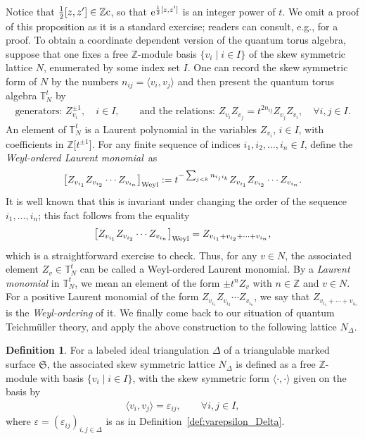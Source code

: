 \documentclass[pdftex]{sigma}
\numberwithin{equation}{section}
\theoremstyle{definition}
\newtheorem{Definition}[Theorem]{Definition}
\begin{document}
Notice that $\frac{1}{2} [z,z'] \in \mathbb{Z}{\rm c}$, so that ${\rm e}^{\frac{1}{2} [z,z']}$ is an integer power of $t$. We omit a proof of this proposition as it is a standard exercise; readers can consult, e.g., \cite{Kim_mutation} for a proof.
To obtain a coordinate dependent version of the quantum torus algebra, suppose that one fixes a free $\mathbb{Z}$-module basis $\{v_i \mid i \in I\}$ of the skew symmetric lattice $N$, enumerated by some index set $I$. One can record the skew symmetric form of $N$ by the numbers $n_{ij} = \langle v_i, v_j \rangle$ and then present the quantum torus algebra $\mathbb{T}^t_N$ by
\begin{align*}
\mbox{generators: } Z_{v_i}^{\pm 1}, \quad i\in I, \qquad \mbox{and the relations: } Z_{v_i} Z_{v_j} = t^{2 n_{ij}} Z_{v_j} Z_{v_i}, \quad \forall i,j\in I.
\end{align*}
An element of $\mathbb{T}^t_N$ is a Laurent polynomial in the variables $Z_{v_i}$, $i\in I$, with coefficients in $\mathbb{Z}\bigl[t^{\pm 1}\bigr]$. For any finite sequence of indices $i_1,i_2,\dots,i_n \in I$, define the {\em Weyl-ordered Laurent monomial}~as
\begin{align}
\label{eq:Weyl-ordering}
\bigl[Z_{v_{i_1}} Z_{v_{i_2}} \cdots Z_{v_{i_n}} \bigr]_{\rm Weyl} := t^{-\sum_{j<k} n_{i_j i_k}} Z_{v_{i_1}} Z_{v_{i_2}} \cdots Z_{v_{i_n}}.
\end{align}
It is well known that this is invariant under changing the order of the sequence $i_1,\dots,i_n$; this fact follows from the equality
\[
\bigl[Z_{v_{i_1}} Z_{v_{i_2}} \cdots Z_{v_{i_n}} \bigr]_{\rm Weyl} = Z_{v_{i_1} + v_{i_2} + \cdots + v_{i_n}},
\]
which is a straightforward exercise to check. Thus, for any $v\in N$, the associated element $Z_v \in \mathbb{T}^t_N$ can be called a Weyl-ordered Laurent monomial. By a {\em Laurent monomial} in $\mathbb{T}^t_N$, we mean an element of the form $\pm t^n Z_v$ with $n \in \mathbb{Z}$ and $v\in N$. For a positive Laurent monomial of the form $Z_{v_{i_1}} Z_{v_{i_2}} \cdots Z_{v_{i_n}}$, we say that $Z_{v_{i_1}+\cdots+v_{i_n}}$ is the {\em Weyl-ordering} of it.
We finally come back to our situation of quantum Teichm\"uller theory, and apply the above construction to the following lattice $N_\Delta$.
\begin{Definition}\label{def:N_Delta}
For a labeled ideal triangulation $\Delta$ of a triangulable marked surface $\mathfrak{S}$, the associated skew symmetric lattice $N_\Delta$ is defined as a free $\mathbb{Z}$-module with basis $\{v_i \mid i \in I\}$, with the skew symmetric form $\langle \cdot, \cdot \rangle$ given on the basis by
\begin{align}
\label{eq:skew-form_for_Delta}
\langle v_i, v_j \rangle = \varepsilon_{ij}, \qquad \forall i,j \in I,
\end{align}
where $\varepsilon = (\varepsilon_{ij})_{i,j\in \Delta}$ is as in Definition~\ref{def:varepsilon_Delta}.
\end{Definition}
\end{document}
